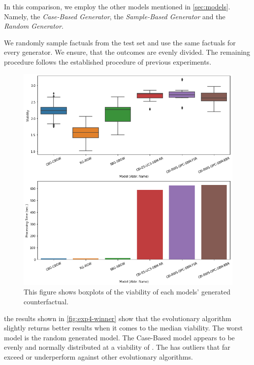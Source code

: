 \documentclass[./../../paper.tex]{subfiles}
\begin{document}
In this comparison, we employ the other models mentioned in \autoref{sec:models}. Namely, the \emph{Case-Based Generator}, the \emph{Sample-Based Generator} and the \emph{Random Generator}. 

We randomly sample  factuals from the test set and use the same factuals for every generator. We ensure, that the outcomes are evenly divided. The remaining procedure follows the established procedure of previous experiments.

\begin{figure}[htbp]
    \centering
    \includegraphics[width=\textwidth]{figures/generated/exp4_winner_overall.png}
    \caption{This figure shows boxplots of the viability of each models' generated counterfactual.}
    \label{fig:exp4-winner}
\end{figure}

\noindent the results shown in \autoref{fig:exp4-winner} show that the evolutionary algorithm  slightly returns better results when it comes to the median viability. The worst model is the random generated model. The Case-Based model appears to be evenly and normally distributed at a viability of . The  has outliers that far exceed or underperform against other evolutionary algorithms. 
\end{document}
